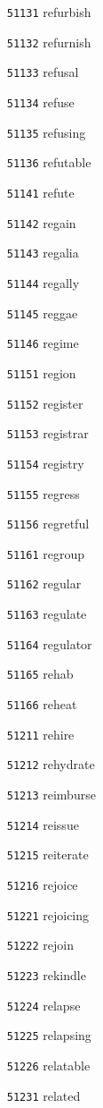 \documentclass[twoside,11pt]{article}
\begin{document}
\begin{multicols}{5}
\begin{enumerate}
\item[\texttt{51131}] refurbish
\item[\texttt{51132}] refurnish
\item[\texttt{51133}] refusal
\item[\texttt{51134}] refuse
\item[\texttt{51135}] refusing
\item[\texttt{51136}] refutable
\item[\texttt{51141}] refute
\item[\texttt{51142}] regain
\item[\texttt{51143}] regalia
\item[\texttt{51144}] regally
\item[\texttt{51145}] reggae
\item[\texttt{51146}] regime
\item[\texttt{51151}] region
\item[\texttt{51152}] register
\item[\texttt{51153}] registrar
\item[\texttt{51154}] registry
\item[\texttt{51155}] regress
\item[\texttt{51156}] regretful
\item[\texttt{51161}] regroup
\item[\texttt{51162}] regular
\item[\texttt{51163}] regulate
\item[\texttt{51164}] regulator
\item[\texttt{51165}] rehab
\item[\texttt{51166}] reheat
\item[\texttt{51211}] rehire
\item[\texttt{51212}] rehydrate
\item[\texttt{51213}] reimburse
\item[\texttt{51214}] reissue
\item[\texttt{51215}] reiterate
\item[\texttt{51216}] rejoice
\item[\texttt{51221}] rejoicing
\item[\texttt{51222}] rejoin
\item[\texttt{51223}] rekindle
\item[\texttt{51224}] relapse
\item[\texttt{51225}] relapsing
\item[\texttt{51226}] relatable
\item[\texttt{51231}] related

\end{enumerate}
\end{multicols}
\end{document}
